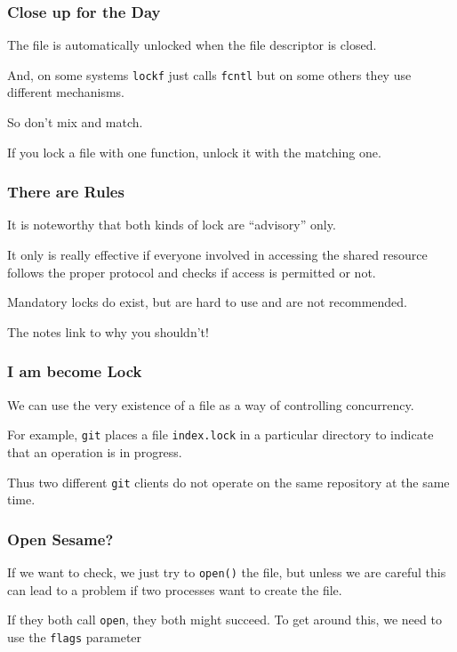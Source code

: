 \begin{frame}
	\frametitle{Close up for the Day}

	The file is automatically unlocked when the file descriptor is closed.

	And, on some systems \texttt{lockf} just calls \texttt{fcntl} but on some others they use different mechanisms.

	So don't mix and match.

	If you lock a file with one function, unlock it with the matching one.


\end{frame}


\begin{frame}
	\frametitle{There are Rules}

	It is noteworthy that both kinds of lock are ``advisory'' only.

	It only is really effective if everyone involved in accessing the shared resource follows the proper protocol and checks if access is permitted or not.

	Mandatory locks do exist, but are hard to use and are not recommended.

	The notes link to why you shouldn't!


\end{frame}

\begin{frame}
	\frametitle{I am become Lock}

	We can use the very existence of a file as a way of controlling concurrency.

	For example, \texttt{git} places a file \texttt{index.lock} in a particular directory to indicate that an operation is in progress.

	Thus two different \texttt{git} clients do not operate on the same repository at the same time.

\end{frame}



\begin{frame}
	\frametitle{Open Sesame?}

	If we want to check, we just try to \texttt{open()} the file, but unless we are careful this can lead to a problem if two processes want to create the file.

	If they both call \texttt{open}, they both might succeed. To get around this, we need to use the \texttt{flags} parameter

\end{frame}



